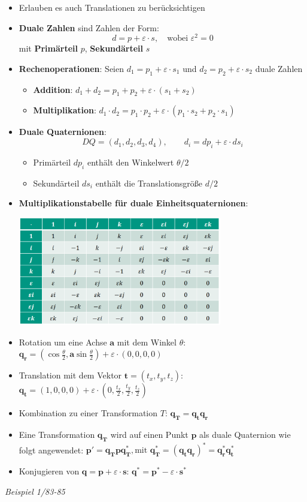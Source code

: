 \begin{itemize}
	\item Erlauben es auch Translationen zu berücksichtigen
	\item \textbf{Duale Zahlen} sind Zahlen der Form:
	$$d=p+\varepsilon\cdot s, \quad\text{wobei }\varepsilon^2=0$$ 
	mit \textbf{Primärteil} $p$, \textbf{Sekundärteil} $s$
	\item \textbf{Rechenoperationen}: Seien $d_1=p_1+\varepsilon\cdot s_1$ und $d_2=p_2+\varepsilon\cdot s_2$ duale Zahlen
	\begin{itemize}
		\item \textbf{Addition}: $d_1+d_2=p_1+p_2+\varepsilon\cdot(s_1+s_2)$
		\item \textbf{Multiplikation}: $d_1\cdot d_2=p_1\cdot p_2+\varepsilon\cdot(p_1\cdot s_2+p_2\cdot s_1)$
	\end{itemize}
	\item \textbf{Duale Quaternionen}: 
	$$DQ=(d_1,d_2,d_3,d_4), \qquad d_i=dp_i+\varepsilon\cdot ds_i$$
	\begin{itemize}
		\item Primärteil $dp_i$ enthält den Winkelwert $\theta/2$
		\item Sekundärteil $ds_i$ enthält die Translationsgröße $d/2$
	\end{itemize}
	\item \textbf{Multiplikationstabelle für duale Einheitsquaternionen}:
	\begin{center}
		\includegraphics[width=0.7\textwidth]{images/duale-quaternionen.png}
	\end{center}
	\item Rotation um eine Achse $\mathbf{a}$ mit dem Winkel $\theta$: $\mathbf{q_r}=\left(\cos\frac{\theta}{2},\mathbf{a}\sin\frac{\theta}{2}\right)+\varepsilon\cdot(0,0,0,0)$
	\item Translation mit dem Vektor $\mathbf{t}=(t_x,t_y,t_z)$: $\mathbf{q_t}=(1,0,0,0)+\varepsilon\cdot(0,\frac{t_x}{2},\frac{t_y}{2},\frac{t_z}{2})$
	\item Kombination zu einer Transformation $T$: $\mathbf{q_T}=\mathbf{q_tq_r}$
	\item Eine Transformation $\mathbf{q_T}$ wird auf einen Punkt $\mathbf{p}$ als duale Quaternion wie folgt angewendet: $\mathbf{p'}=\mathbf{q_Tpq_T^*}, \text{mit }\mathbf{q_T^*}=(\mathbf{q_tq_r})^*=\mathbf{q_r^*q_t^*}$
	\item Konjugieren von $\mathbf{q}=\mathbf{p}+\varepsilon\cdot\mathbf{s}$: $\mathbf{q^*}=\mathbf{p^*}-\varepsilon\cdot\mathbf{s^*}$
\end{itemize}
\medskip
\textit{Beispiel 1/83-85}\\

